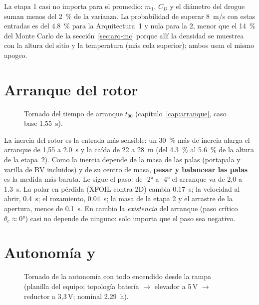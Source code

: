 La etapa 1 casi no importa para el promedio: $m_1$, $C_D$ y el diámetro del drogue suman menos
del \SI{2}{\percent} de la varianza. La probabilidad de superar \SI{8}{m/s} con estas entradas
es del \SI{4.8}{\percent} para la Arquitectura~1 y nula para la 2, menor que el
\SI{14}{\percent} del Monte Carlo de la sección~\ref{sec:arq-mc} porque allí la densidad se
muestrea con la altura del sitio y la temperatura (más cola superior); ambos usan el mismo
apogeo.

\section{Arranque del rotor}\label{sec:sens-arranque}

\begin{figure}[H]
\centering

\caption{Tornado del tiempo de arranque $t_{90}$ (capítulo~\ref{cap:arranque}, caso base
\SI{1.55}{s}).}
\label{fig:sens-tornado-t90}
\end{figure}

La inercia del rotor es la entrada más sensible: un \SI{30}{\percent} más de inercia
alarga el arranque de 1,55 a \SI{2.0}{s} y la caída de 22 a \SI{28}{m} (del \SI{4.3}{\percent} al
\SI{5.6}{\percent} de la altura de la etapa~2). Como la inercia
depende de la masa de las palas (portapala y varilla de BV incluidos) y de su centro de masa,
\textbf{pesar y balancear las palas} es la medida más barata. Le sigue el paso: de \ang{-2} a
\ang{-4} el arranque va de 2,0 a \SI{1.3}{s}. La polar en pérdida (XFOIL contra 2D) cambia
\SI{0.17}{s}; la velocidad al abrir, \SI{0.4}{s}; el rozamiento, \SI{0.04}{s}; la masa de la
etapa 2 y el arrastre de la apertura, menos de \SI{0.1}{s}. En cambio la \emph{existencia} del
arranque (paso crítico $\theta_c\approx\ang{0}$) casi no depende de ninguno: solo importa que
el paso sea negativo.

\section{Autonomía y \texorpdfstring{}{E7}}\label{sec:sens-energia}

\begin{figure}[H]
\centering

\caption{Tornado de la autonomía con todo encendido desde la rampa (planilla del equipo;
topología batería $\to$ elevador a 5\,V $\to$ reductor a 3,3\,V; nominal \SI{2.29}{h}).}
\label{fig:sens-tornado-E7}
\end{figure}


